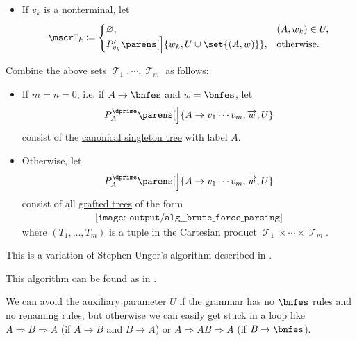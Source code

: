 \begin{algorithm}
\begin{thmenum}
\begin{itemize}
      \item If \( v_k \) is a nonterminal, let
      \begin{equation*}
        \mscrT_k \coloneqq \begin{cases}
          \varnothing,                                         &(A, w_k) \in U, \\
          P'_{v_k}\parens[\Big]{ w_k, U \cup \set{ (A, w) } }, &\T{otherwise.}
        \end{cases}
      \end{equation*}
    \end{itemize}

     Combine the above sets \( \mscrT_1, \cdots, \mscrT_m \) as follows:
    \begin{itemize}
      \item If \( m = n = 0 \), i.e. if \( A \to \bnfes \) and \( w = \bnfes \), let
      \begin{equation*}
        P^\dprime_A\parens[\Big]{ A \to v_1 \cdots v_m, \vect w, U }
      \end{equation*}
      consist of the \hyperref[def:canonical_singleton_tree]{canonical singleton tree} with label \( A \).

      \item Otherwise, let
      \begin{equation*}
        P^\dprime_A\parens[\Big]{ A \to v_1 \cdots v_m, \vect w, U }
      \end{equation*}
      consist of all \hyperref[def:ordered_tree_grafting_product]{grafted trees} of the form
      \begin{equation*}
        \begin{aligned}
          \texttt{[image: output/alg\_\_brute\_force\_parsing]}
        \end{aligned}
      \end{equation*}
      where \( (T_1, \ldots, T_m) \) is a tuple in the Cartesian product \( \mscrT_1 \times \cdots \times \mscrT_m \).
    \end{itemize}
  \end{thmenum}
\end{algorithm}
\begin{comments}
  \item This is a variation of Stephen Unger's algorithm described in \cite{Unger1968Parser}.
  \item This algorithm can be found as  in \cite{notebook:code}.
  \item We can avoid the auxiliary parameter \( U \) if the grammar has no \hyperref[def:epsilon_free_grammar]{\( \bnfes \) rules} and no \hyperref[def:renaming_rule]{renaming rules}, but otherwise we can easily get stuck in a loop like \( A \Rightarrow B \Rightarrow A \) (if \( A \to B \) and \( B \to A \)) or \( A \Rightarrow AB \Rightarrow A \) (if \( B \to \bnfes \)).
\end{comments}

